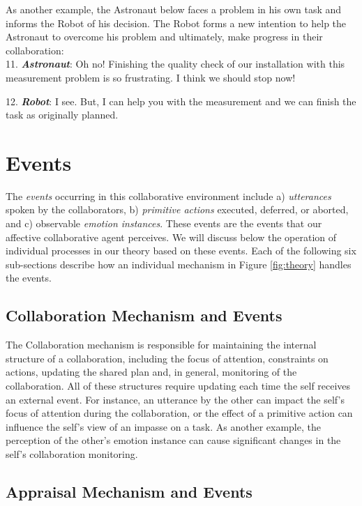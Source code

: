 \documentclass[12pt]{report}
\begin{document}
As another example, the Astronaut below faces a problem in his own task and
informs the Robot of his decision. The Robot forms a new intention to help the
Astronaut to overcome his problem and ultimately, make progress in their
collaboration:\\
 
  11. \textbf{\textit{Astronaut}}: Oh no! Finishing the quality check of our
  installation with this measurement problem is so frustrating. I think we
  should stop now!

  12. \textbf{\textit{Robot}}: I see. But, I can help you with the measurement  
  and we can finish the task as originally planned.\\

\section{Events}
\label{sec:events}

The \textit{events} occurring in this collaborative environment include a)
\textit{utterances} spoken by the collaborators, b) \textit{primitive actions}
executed, deferred, or aborted, and c) observable \textit{emotion instances}.
These events are the events that our affective collaborative agent perceives. We
will discuss below the operation of individual processes in our theory based on
these events. Each of the following six sub-sections describe how an individual
mechanism in Figure \ref{fig:theory} handles the events.

\subsection{Collaboration Mechanism and Events}

The Collaboration mechanism is responsible for maintaining the internal
structure of a collaboration, including the focus of attention, constraints on
actions, updating the shared plan and, in general, monitoring of the
collaboration. All of these structures require updating each time the self
receives an external event. For instance, an utterance by the other can impact
the self's focus of attention during the collaboration, or the effect of a
primitive action can influence the self's view of an impasse on a task. As
another example, the perception of the other's emotion instance can cause
significant changes in the self's collaboration monitoring.

\subsection{Appraisal Mechanism and Events}
\label{sec:appraisal-event}
\end{document}
